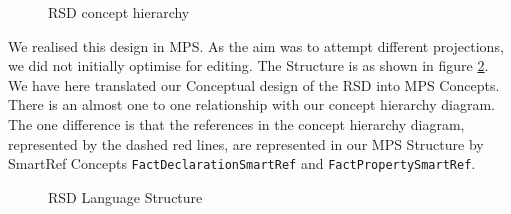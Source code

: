 \begin{figure}
    \centering
    \caption{RSD concept hierarchy}
    \label{fig:RSDDiagram}
\end{figure}

We realised this design in MPS.
As the aim was to attempt different projections, we did not initially optimise for editing.
The Structure is as shown in figure \ref{fig:RSDStructure}.
We have here translated our Conceptual design of the RSD into MPS Concepts.
There is an almost one to one relationship with our concept hierarchy diagram.
The one difference is that the references in the concept hierarchy diagram, represented by the dashed red lines, are represented in our MPS Structure by SmartRef Concepts \texttt{FactDeclarationSmartRef} and \texttt{FactPropertySmartRef}.

\begin{figure}[h]
    \centering
    \caption{RSD Language Structure}
    \label{fig:RSDStructure}
\end{figure}

